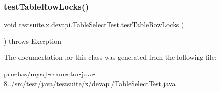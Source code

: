 \subsubsection{\texorpdfstring{test\+Table\+Row\+Locks()}{testTableRowLocks()}}
{\footnotesize\ttfamily void testsuite.\+x.\+devapi.\+Table\+Select\+Test.\+test\+Table\+Row\+Locks (\begin{DoxyParamCaption}{ }\end{DoxyParamCaption}) throws Exception}



The documentation for this class was generated from the following file\+:\begin{DoxyCompactItemize}
\item 
pruebas/mysql-\/connector-\/java-\/8../src/test/java/testsuite/x/devapi/\mbox{\hyperlink{_table_select_test_8java}{Table\+Select\+Test.\+java}}\end{DoxyCompactItemize}
